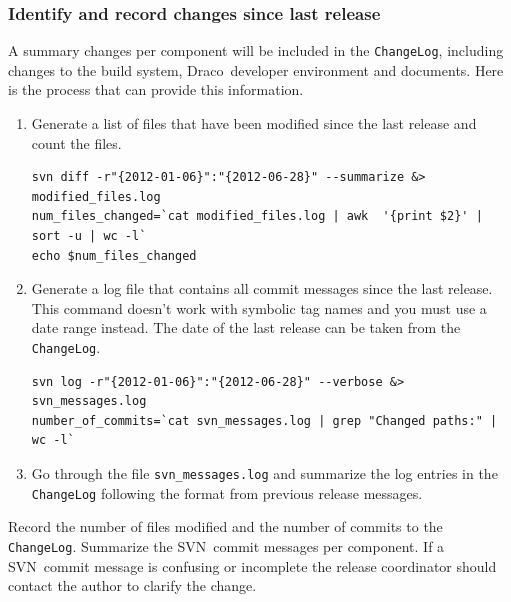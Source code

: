 \documentclass[note]{ResearchNote_pdf}
\newcommand{\draco}{{\normalfont\small\sffamily Draco}}
\newcommand{\cvs}{\textsf{CVS}}
\newcommand{\svn}{\textsf{SVN}}
\begin{document}

\subsubsection{Identify and record changes since last release}
\label{sec:changes_since_lr}

A summary changes per component will be included in the
\texttt{ChangeLog}, including changes to the build system,
\draco\ developer environment and documents.
Here is the process that can provide this information.

\begin{enumerate}
\item Generate a list of files that have been modified since the last release and count the files.
\begin{lstlisting}[basicstyle=\footnotesize, xleftmargin=.25in, 
  xrightmargin=0.25in]
svn diff -r"{2012-01-06}":"{2012-06-28}" --summarize &> modified_files.log
num_files_changed=`cat modified_files.log | awk  '{print $2}' | sort -u | wc -l`
echo $num_files_changed
\end{lstlisting}
\item Generate a log file that contains all commit messages since the last
  release.  This command doesn't work with symbolic tag names and you
  must use a date range instead.  The date of the last release can be
  taken from the \texttt{ChangeLog}.
\begin{lstlisting}[basicstyle=\footnotesize, xleftmargin=0.25in, 
  xrightmargin=0.25in]
svn log -r"{2012-01-06}":"{2012-06-28}" --verbose &> svn_messages.log  
number_of_commits=`cat svn_messages.log | grep "Changed paths:" | wc -l`
\end{lstlisting}
\item Go through the file \texttt{svn\_messages.log}
  and summarize the log entries in the \texttt{ChangeLog} following the format from previous release messages.
\end{enumerate}

Record the number of files modified and the number of commits to the
\texttt{ChangeLog}. Summarize the \svn\ commit messages per component.
If a \svn\ commit message is confusing or incomplete the release
coordinator should contact the author to clarify the change.
\end{document}

